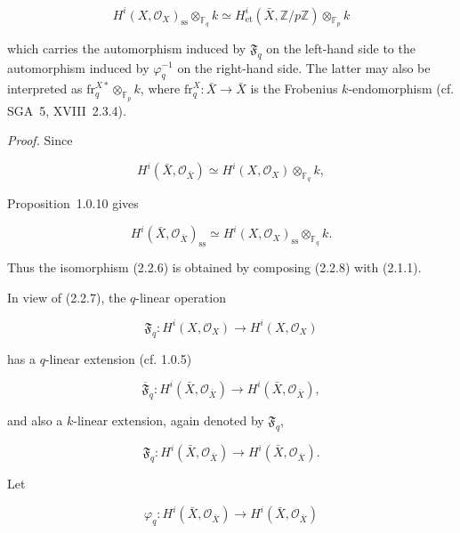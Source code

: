 \begin{equation}\tag{2.2.6}
H^i(X,\mathcal O_X)_{\mathrm{ss}}\otimes_{\mathbb F_q}k
\simeq
H^i_{\mathrm{et}}(\bar X,\mathbb Z/p\mathbb Z)
\otimes_{\mathbb F_p}k
\end{equation}

which carries the automorphism induced by $\mathfrak F_q$ on the left-hand
side to the automorphism induced by $\varphi_q^{-1}$ on the right-hand side.
The latter may also be interpreted as
$\mathrm{fr}_q^{X*}\otimes_{\mathbb F_p}k$, where
$\mathrm{fr}_q^X:\bar X\longrightarrow\bar X$ is the Frobenius
$k$-endomorphism (cf. SGA~5, XVIII~2.3.4).

\medskip
\noindent\emph{Proof.}
Since

\begin{equation}\tag{2.2.7}
H^i(\bar X,\mathcal O_{\bar X})\simeq
H^i(X,\mathcal O_X)\otimes_{\mathbb F_q}k,
\end{equation}

Proposition~1.0.10 gives

\begin{equation}\tag{2.2.8}
H^i(\bar X,\mathcal O_{\bar X})_{\mathrm{ss}}\simeq
H^i(X,\mathcal O_X)_{\mathrm{ss}}\otimes_{\mathbb F_q}k.
\end{equation}

Thus the isomorphism (2.2.6) is obtained by composing (2.2.8) with
(2.1.1).

In view of (2.2.7), the $q$-linear operation

\begin{equation}\tag{2.2.9}
\mathfrak F_q:H^i(X,\mathcal O_X)\longrightarrow H^i(X,\mathcal O_X)
\end{equation}

has a $q$-linear extension (cf. 1.0.5)

\begin{equation}\tag{2.2.10}
\overline{\mathfrak F}_q:H^i(\bar X,\mathcal O_{\bar X})
\longrightarrow H^i(\bar X,\mathcal O_{\bar X}),
\end{equation}

and also a $k$-linear extension, again denoted by
$\mathfrak F_q$,

\begin{equation}\tag{2.2.11}
\mathfrak F_q:H^i(\bar X,\mathcal O_{\bar X})
\longrightarrow H^i(\bar X,\mathcal O_{\bar X}).
\end{equation}

Let

\begin{equation}\tag{2.2.12}
\varphi_q:H^i(\bar X,\mathcal O_{\bar X})
\longrightarrow H^i(\bar X,\mathcal O_{\bar X})
\end{equation}

